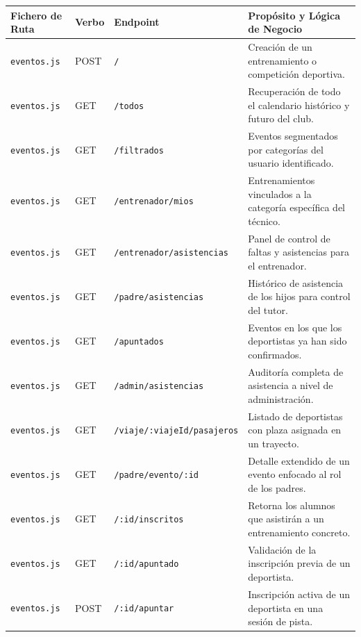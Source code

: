         \begin{table}[htbp]
        \centering
        \scriptsize
        \renewcommand{\arraystretch}{0.95}
        \begin{tabularx}{\textwidth}{|l|l|l|X|}
        \hline
        \rowcolor[HTML]{EFEFEF} 
        \textbf{Fichero de Ruta} & \textbf{Verbo} & \textbf{Endpoint} & \textbf{Propósito y Lógica de Negocio} \\ \hline
        \texttt{eventos.js} & POST & \texttt{/} & Creación de un entrenamiento o competición deportiva. \\ \hline
        \texttt{eventos.js} & GET & \texttt{/todos} & Recuperación de todo el calendario histórico y futuro del club. \\ \hline
        \texttt{eventos.js} & GET & \texttt{/filtrados} & Eventos segmentados por categorías del usuario identificado. \\ \hline
        \texttt{eventos.js} & GET & \texttt{/entrenador/mios} & Entrenamientos vinculados a la categoría específica del técnico. \\ \hline
        \texttt{eventos.js} & GET & \texttt{/entrenador/asistencias} & Panel de control de faltas y asistencias para el entrenador. \\ \hline
        \texttt{eventos.js} & GET & \texttt{/padre/asistencias} & Histórico de asistencia de los hijos para control del tutor. \\ \hline
        \texttt{eventos.js} & GET & \texttt{/apuntados} & Eventos en los que los deportistas ya han sido confirmados. \\ \hline
        \texttt{eventos.js} & GET & \texttt{/admin/asistencias} & Auditoría completa de asistencia a nivel de administración. \\ \hline
        \texttt{eventos.js} & GET & \texttt{/viaje/:viajeId/pasajeros} & Listado de deportistas con plaza asignada en un trayecto. \\ \hline
        \texttt{eventos.js} & GET & \texttt{/padre/evento/:id} & Detalle extendido de un evento enfocado al rol de los padres. \\ \hline
        \texttt{eventos.js} & GET & \texttt{/:id/inscritos} & Retorna los alumnos que asistirán a un entrenamiento concreto. \\ \hline
        \texttt{eventos.js} & GET & \texttt{/:id/apuntado} & Validación de la inscripción previa de un deportista. \\ \hline
        \texttt{eventos.js} & POST & \texttt{/:id/apuntar} & Inscripción activa de un deportista en una sesión de pista. \\ \hline

\end{tabularx}
\end{table}
